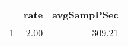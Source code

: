 \begin{table}[h]
\centering
\begin{tabular}{rrr}
  \hline
 & rate & avgSampPSec \\ 
  \hline
1 & 2.00 & 309.21 \\ 
   \hline
\end{tabular}
\end{table}
